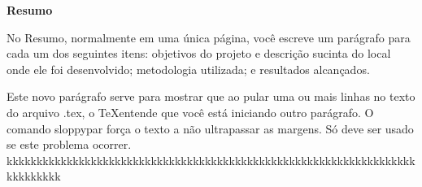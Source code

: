 
\begin{center}
\huge{{\bf Resumo}}
\vspace{2cm}
\end{center}

No Resumo, normalmente em uma única página, você escreve um parágrafo para cada um dos seguintes itens: objetivos do projeto e descrição sucinta do local onde ele foi desenvolvido; 
metodologia utilizada; e resultados alcançados.
 
\begin{sloppypar}
Este novo parágrafo serve para mostrar que ao pular uma ou mais linhas no texto do arquivo .tex, o \TeX entende que você está iniciando outro parágrafo. O comando sloppypar força o texto a n\~ao ultrapassar as margens. S\'o deve ser usado se este problema ocorrer. kkkkkkkkkkkkkkkkkkkkkkkkkkkkkkkkkkkkkkkkkkkkkkkkkkkkkkkkkkkkkkkkkkkkkkkkkkkkk 
\end{sloppypar}

 
\clearpage
\thispagestyle{empty}
\cleardoublepage

